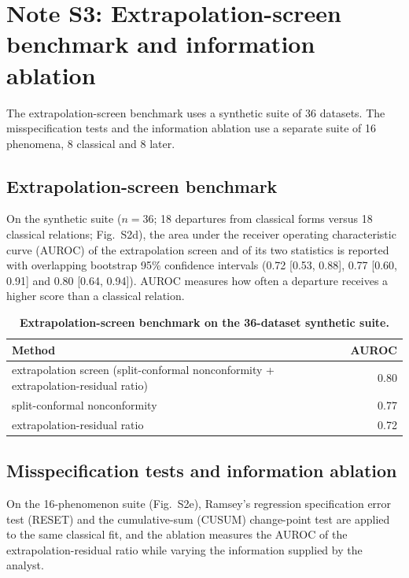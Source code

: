 \documentclass{article}
\begin{document}
\section{Note S3: Extrapolation-screen benchmark and information ablation}

The extrapolation-screen benchmark uses a synthetic suite of 36 datasets. The misspecification tests and the information ablation use a separate suite of 16 phenomena, 8 classical and 8 later.

\subsection{Extrapolation-screen benchmark}

On the synthetic suite ($n = 36$; 18 departures from classical forms versus 18 classical relations; Fig.~S2d), the area under the receiver operating characteristic curve (AUROC) of the extrapolation screen and of its two statistics is reported with overlapping bootstrap 95\% confidence intervals (0.72 [0.53, 0.88], 0.77 [0.60, 0.91] and 0.80 [0.64, 0.94]). AUROC measures how often a departure receives a higher score than a classical relation.

\begin{table}[htbp]
\centering
\caption{\textbf{Extrapolation-screen benchmark on the 36-dataset synthetic suite.}}
\small
\begin{tabular}{@{}lr@{}}
\toprule
Method & AUROC \\
\midrule
extrapolation screen (split-conformal nonconformity + extrapolation-residual ratio) & 0.80 \\
split-conformal nonconformity & 0.77 \\
extrapolation-residual ratio & 0.72 \\
\bottomrule
\end{tabular}
\end{table}

\subsection{Misspecification tests and information ablation}

On the 16-phenomenon suite (Fig.~S2e), Ramsey's regression specification error test (RESET) and the cumulative-sum (CUSUM) change-point test are applied to the same classical fit, and the ablation measures the AUROC of the extrapolation-residual ratio while varying the information supplied by the analyst.
\end{document}
